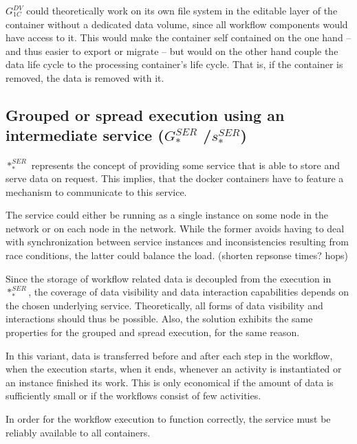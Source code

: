   $G_{1C}^{DV}$ could theoretically work on its own file system in the editable layer of the container without a dedicated data volume, since all workflow components would have access to it. This would make the container self contained on the one hand -- and thus easier to export or migrate -- but would on the other hand couple the data life cycle to the processing container's life cycle. That is, if the container is removed, the data is removed with it.


\subsection[Grouped or spread execution using an intermediate service]{Grouped or spread execution using an intermediate service ($G_{*}^{SER}$ /$s_{*}^{SER}$)} %
\label{sub:grouped_execution_using_a_intermediate_service}

  $*_{*}^{SER}$ represents the concept of providing some service that is able to store and serve data on request. This implies, that the docker containers have to feature a mechanism to communicate to this service.

  The service could either be running as a single instance on some node in the network or on each node in the network. While the former avoids having to deal with synchronization between service instances and inconsistencies resulting from race conditions, the latter could balance the load. (shorten repsonse times? hops)

  Since the storage of workflow related data is decoupled from the execution in $*_{*}^{SER}$, the coverage of data visibility and data interaction capabilities depends on the chosen underlying service. Theoretically, all forms of data visibility and interactions should thus be possible. Also, the solution exhibits the same properties for the grouped and spread execution, for the same reason.

  In this variant, data is transferred before and after each step in the workflow, \ie when the execution starts, when it ends, whenever an activity is instantiated or an instance finished its work. This is only economical if the amount of data is sufficiently small or if the workflows consist of few activities.

  In order for the workflow execution to function correctly, the service must be reliably available to all containers.


